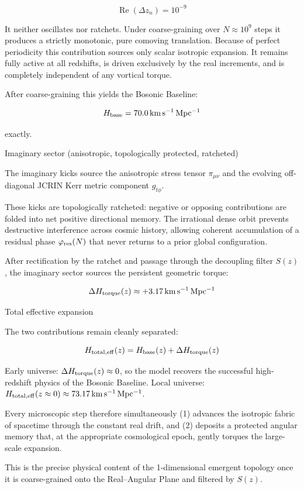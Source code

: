 \[
\operatorname{Re}(\Delta z_n)=10^{-9}
\]

It neither oscillates nor ratchets. Under coarse-graining over \(N\approx10^9\) steps it produces a strictly monotonic, pure comoving translation. Because of perfect periodicity this contribution sources only scalar isotropic expansion. It remains fully active at all redshifts, is driven exclusively by the real increments, and is completely independent of any vortical torque.

After coarse-graining this yields the Bosonic Baseline:

\[
H_{\rm base}=70.0\,\mathrm{km\,s^{-1}\,Mpc^{-1}}
\]

exactly.

Imaginary sector (anisotropic, topologically protected, ratcheted)

The imaginary kicks source the anisotropic stress tensor \(\pi_{\mu\nu}\) and the evolving off-diagonal JCRIN Kerr metric component \(g_{t\phi}\).  

These kicks are topologically ratcheted: negative or opposing contributions are folded into net positive directional memory. The irrational dense orbit prevents destructive interference across cosmic history, allowing coherent accumulation of a residual phase \(\varphi_{\rm res}(N)\) that never returns to a prior global configuration.

After rectification by the ratchet and passage through the decoupling filter \(S(z)\), the imaginary sector sources the persistent geometric torque:

\[
\Delta H_{\rm torque}(z)\approx+3.17\,\mathrm{km\,s^{-1}\,Mpc^{-1}}
\]

Total effective expansion

The two contributions remain cleanly separated:

\[
H_{\rm total,eff}(z)=H_{\rm base}(z)+\Delta H_{\rm torque}(z)
\]

Early universe: \(\Delta H_{\rm torque}(z)\approx0\), so the model recovers the successful high-redshift physics of the Bosonic Baseline.
Local universe: \(H_{\rm total,eff}(z\approx0)\approx73.17\,\mathrm{km\,s^{-1}\,Mpc^{-1}}\).

Every microscopic step therefore simultaneously  
(1) advances the isotropic fabric of spacetime through the constant real drift, and  
(2) deposits a protected angular memory that, at the appropriate cosmological epoch, gently torques the large-scale expansion.

This is the precise physical content of the 1-dimensional emergent topology once it is coarse-grained onto the Real–Angular Plane and filtered by \(S(z)\).

